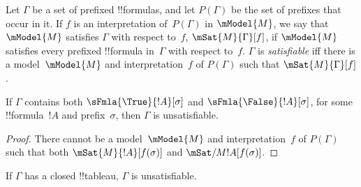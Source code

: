 \documentclass[../../../include/open-logic-section]{subfiles}
\begin{document}
\begin{defn}
  Let $\Gamma$ be a set of prefixed !!{formula}s, and let $P(\Gamma)$
  be the set of prefixes that occur in it. If $f$ is an interpretation
  of~$P(\Gamma)$ in $\mModel{M}$, we say that $\mModel{M}$ satisfies
  $\Gamma$ with respect to~$f$, $\mSat{M}{\Gamma}[f]$, if $\mModel{M}$
  satisfies every prefixed !!{formula} in~$\Gamma$ with respect
  to~$f$. $\Gamma$ is \emph{satisfiable} iff there is a
  model~$\mModel{M}$ and interpretation~$f$ of $P(\Gamma)$ such that
  $\mSat{M}{\Gamma}[f]$.
\end{defn}

\begin{prop}
  If $\Gamma$ contains both $\sFmla{\True}{!A}[\sigma]$ and
  $\sFmla{\False}{!A}[\sigma]$, for some !!{formula}~$!A$ and
  prefix~$\sigma$, then $\Gamma$ is unsatisfiable.
\end{prop}

\begin{proof}
  There cannot be a model~$\mModel{M}$ and interpretation~$f$ of
  $P(\Gamma)$ such that both $\mSat{M}{!A}[f(\sigma)]$ and
  $\mSat/{M}{!A}[f(\sigma)]$.
\end{proof}

\begin{thm}[Soundness]
  If $\Gamma$ has a closed !!{tableau}, $\Gamma$ is unsatisfiable.
\end{thm}
\end{document}
